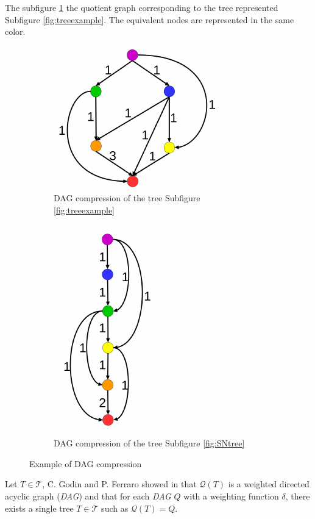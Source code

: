The subfigure \ref{fig:dagexample} the quotient graph
corresponding to the tree represented Subfigure \ref{fig:treeexample}. The
equivalent nodes are represented in the same color.

\begin{figure}[h]
  \begin{subfigure}[b]{0.45\textwidth}
    \centering
    \includegraphics[width=.5\textwidth]{figures/dag2.pdf}
    \caption{DAG compression of the tree Subfigure \ref{fig:treeexample}}
    \label{fig:dagexample}
  \end{subfigure}
  \quad
  \begin{subfigure}[b]{0.45\textwidth}
    \centering
    \includegraphics[width=.3\textwidth]{figures/dag.pdf}
    \caption{DAG compression of the tree Subfigure \ref{fig:SNtree}}
    \label{fig:SNdag}
  \end{subfigure} 
  \caption{Example of DAG compression}\label{fig:example}
\end{figure}

Let $T \in \mathcal{T}$, C. Godin and P. Ferraro showed in
\cite{godin} that $\mathcal{Q}(T)$ is a weighted directed acyclic
graph (\emph{DAG}) and that for each \emph{DAG} $Q$ with a weighting
function $\delta$, there exists a single tree $T \in \mathcal{T}$ such
as $\mathcal{Q}(T) = Q$.

